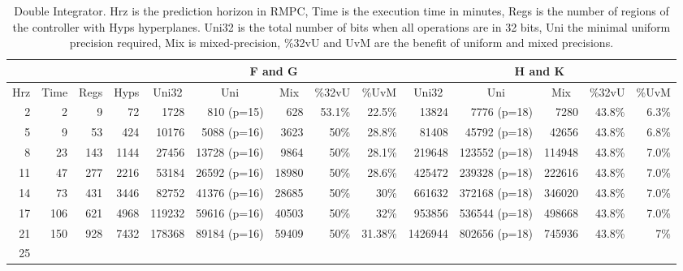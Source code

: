 \begin{table*}[ht]
	\centering
	\caption{Double Integrator.\textmd{ Hrz is the prediction horizon in RMPC, Time is the execution time in minutes, Regs is the number of regions of the controller with Hyps hyperplanes. Uni32 is the total number of bits when all operations are in 32 bits, Uni the minimal uniform precision required, Mix is mixed-precision, \%32vU and UvM are the benefit of uniform and mixed precisions.}}
	\label{tab:di}
	\begin{tabular}{|rrrrrrrrrrrrrr|}
		\cline{5-14}
		\multicolumn{4}{c}{} &
		\multicolumn{5}{|c|}{F and G} &
		\multicolumn{5}{c|}{H and K} \\
		\hline
		\multicolumn{1}{|c}{Hrz}&
		\multicolumn{1}{c}{Time}&
		\multicolumn{1}{c}{Regs} &
		\multicolumn{1}{c}{Hyps} &
		\multicolumn{1}{c}{Uni32}&
		\multicolumn{1}{c}{Uni}&
		\multicolumn{1}{c}{Mix}&
		\multicolumn{1}{c}{\%32vU}&
		\multicolumn{1}{c}{\%UvM}&
		\multicolumn{1}{c}{Uni32}&
		\multicolumn{1}{c}{Uni}&
		\multicolumn{1}{c}{Mix}&
		\multicolumn{1}{c}{\%32vU}&
		\multicolumn{1}{c|}{\%UvM} \\
		\hline
		2 & 2 & 9 & 72 & 1728 & 810 (p=15) & 628 & 53.1\% & 22.5\% & 13824 & 7776 (p=18) & 7280 & 43.8\%& 6.3\% \\
		5 & 9 & 53 & 424 & 10176 & 5088 (p=16) & 3623 & 50\% & 28.8\% & 81408 & 45792 (p=18) & 42656 & 43.8\% & 6.8\% \\
		8 & 23 & 143 & 1144 & 27456 & 13728 (p=16) & 9864 & 50\%  & 28.1\% & 219648 & 123552 (p=18) & 114948 & 43.8\% & 7.0\% \\
		11 & 47 & 277 & 2216 & 53184 & 26592 (p=16) & 18980 & 50\% & 28.6\% & 425472 & 239328 (p=18) & 222616 & 43.8\% & 7.0\% \\
		
		14 & 73 & 431& 3446& 82752& 41376 (p=16)& 28685& 50\% & 30\% & 661632& 372168 (p=18)& 346020& 43.8\% &7.0\% \\
		
		17 & 106 & 621 & 4968 & 119232 & 59616 (p=16) & 40503 & 50\% & 32\% & 953856& 536544 (p=18)& 498668& 43.8\% & 7.0\% \\
		
		21 & 150 & 928 & 7432 & 178368 & 89184 (p=16) & 59409 & 50\% & 31.38\% & 1426944 & 802656 (p=18) & 745936 & 43.8\% & 7\%  \\
		
		25 & & & & & & & & & & & & & \\
		
		\hline
	\end{tabular}
\end{table*}
